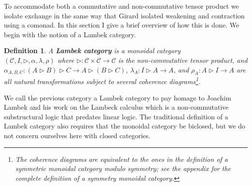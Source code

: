 \documentclass{sigplanconf}
\let\mto\to
\let\to\relax
\newcommand{\to}{\rightarrow}
\newcommand{\cat}[1]{\mathcal{#1}}
\newtheorem{definition}[theorem]{Definition}
\begin{document}

To accommodate both a commutative and non-commutative tensor product
we isolate exchange in the same way that Girard isolated weakening and
contraction using a comonad.  In this section I give a brief overview
of how this is done.  We begin with the notion of a Lambek category.
\begin{definition}
  \label{def:Lambek-category}
  A \textbf{Lambek category} is a monoidal category \\ $(\cat{C}, I,
  \rhd, \alpha, \lambda, \rho)$ where $\rhd : \cat{C} \times \cat{C}
  \mto \cat{C}$ is the non-commutative tensor product, and
  $\alpha_{A,B,C} : (A \rhd B) \rhd C \mto A \rhd (B \rhd C)$,
  $\lambda_A : I \rhd A \mto A$, and $\rho_A : A \rhd I \mto A$ are
  all natural transformations subject to several coherence
  diagrams\footnote{The coherence diagrams are equivalent to the ones
    in the definition of a symmetric monoidal category modulo
    symmetry; see the appendix for the complete definition of a
    symmetry monoidal category.}.
\end{definition}
\noindent
We call the previous category a Lambek category to pay homage to
Joachim Lambek and his work on the Lambeck calculus \cite{Lambek}
which is a non-commutative substructural logic that predates linear
logic.  The traditional definition of a Lambek category also requires
that the monoidal category be biclosed, but we do not concern
ourselves here with closed categories.
\end{document}
